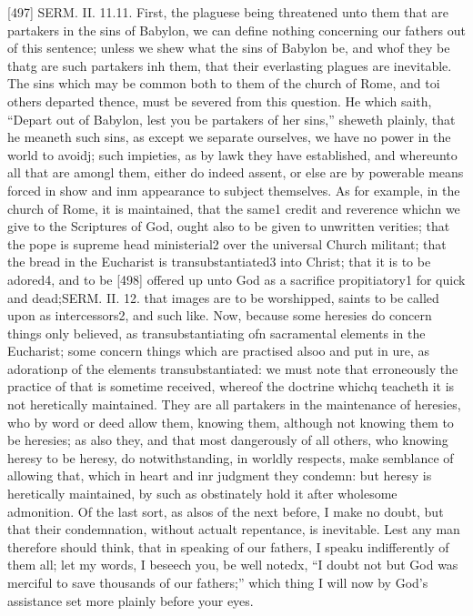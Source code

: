 [497]
SERM. II. 11.11. First, the plaguese being threatened unto them that are partakers in the sins of Babylon, we can define nothing concerning our fathers out of this sentence; unless we shew what the sins of Babylon be, and whof they be thatg are such partakers inh them, that their everlasting plagues are inevitable. The sins which may be common both to them of the church of Rome, and toi others departed thence, must be severed from this question. He which saith, “Depart out of Babylon, lest you be partakers of her sins,” sheweth plainly, that he meaneth such sins, as except we separate ourselves, we have no power in the world to avoidj; such impieties, as by lawk they have established, and whereunto all that are amongl them, either do indeed assent, or else are by powerable means forced in show and inm appearance to subject themselves. As for example, in the church of Rome, it is maintained, that the same1 credit and reverence whichn we give to the Scriptures of God, ought also to be given to unwritten verities; that the pope is supreme head ministerial2 over the universal Church militant; that the bread in the Eucharist is transubstantiated3 into Christ; that it is to be adored4, and to be [498] offered up unto God as a sacrifice propitiatory1 for quick and dead;SERM. II. 12. that images are to be worshipped, saints to be called upon as intercessors2, and such like. Now, because some heresies do concern things only believed, as transubstantiating ofn sacramental elements in the Eucharist; some concern things which are practised alsoo and put in ure, as adorationp of the elements transubstantiated: we must note that erroneously the practice of that is sometime received, whereof the doctrine whichq teacheth it is not heretically maintained. They are all partakers in the maintenance of heresies, who by word or deed allow them, knowing them, although not knowing them to be heresies; as also they, and that most dangerously of all others, who knowing heresy to be heresy, do notwithstanding, in worldly respects, make semblance of allowing that, which in heart and inr judgment they condemn: but heresy is heretically maintained, by such as obstinately hold it after wholesome admonition. Of the last sort, as alsos of the next before, I make no doubt, but that their condemnation, without actualt repentance, is inevitable. Lest any man therefore should think, that in speaking of our fathers, I speaku indifferently of them all; let my words, I beseech you, be well notedx, “I doubt not but God was merciful to save thousands of our fathers;” which thing I will now by God’s assistance set more plainly before your eyes.

